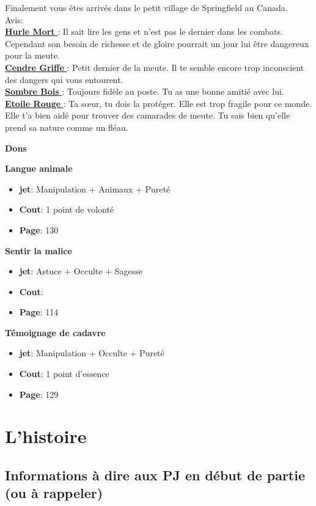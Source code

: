 \documentclass[oneside,12pt]{book}
\newcommand\don[5]{
\textbf{#1} \\
#2
\begin{itemize}
\item{ \textbf{jet}: #3}
\item{ \textbf{Cout}: #4}
\item{ \textbf{Page}: #5}
\end{itemize}
\vspace{0.5cm}
}
\newcommand{\Lynn}{\textbf{Etoile Rouge} }
\newcommand{\Luke}{\textbf{Cendre Griffe} }
\newcommand{\Peter}{\textbf{Hurle Mort} }
\newcommand{\Leonard}{\textbf{Sombre Bois} }
\begin{document}
\begin{flushleft}
\begin{description}
{Finalement vous êtes arrivés dans le petit village de Springfield au Canada.  \\
Avis:\\
\underline{\Peter} : Il sait lire les gens et n'est pas le dernier dans les combats. Cependant son besoin de richesse et de gloire pourrait un jour lui être dangereux pour la meute. \\
\underline{\Luke} : Petit dernier de la meute. Il te semble encore trop inconscient des dangers qui vous entourent.\\
\underline{\Leonard} : Toujours fidèle au poste. Tu as une bonne amitié avec lui.\\
\underline{\Lynn}: Ta sœur, tu dois la protéger. Elle est trop fragile pour ce monde. Elle t'a bien aidé pour trouver des camarades de meute. Tu sais bien qu'elle prend sa nature comme un fléau.\\
}
\end{description}
\clearpage
\textbf{\large Dons} 
\vspace{0.5cm}

\don{Langue animale}{}{Manipulation + Animaux + Pureté}{1 point de volonté}{130}
\don{Sentir la malice}{}{Astuce + Occulte + Sagesse}{}{114}
\don{Témoignage de cadavre}{}{Manipulation + Occulte + Pureté}{1 point d'essence}{129}

\chapter{L'histoire}
\section{Informations à dire aux PJ en début de partie  (ou à rappeler) }

\clearpage


\end{flushleft}
\end{document}
